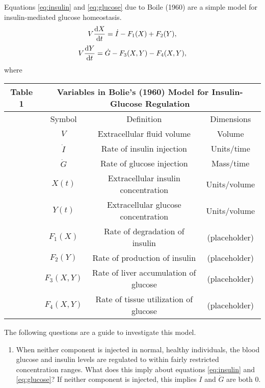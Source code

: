 \begin{homeworkProblem}
Equations \eqref{eq:insulin} and \eqref{eq:glucose} due to Boile (1960) are a
simple model for insulin-mediated glucose homeostasis.
\begin{equation}
    V \deriv[t]{X} = \dot{I} - F_1(X) + F_2(Y), \label{eq:insulin}
\end{equation}
\begin{equation}
    V \deriv[t]{Y} = \dot{G} - F_3(X, Y) - F_4(X, Y), \label{eq:glucose}
\end{equation}
where
\begin{table}[h!]
\centering
\begin{tabular}{c c|c|c}
\textbf{Table 1} &
\multicolumn{3}{|c|}{Variables in Bolie's (1960) Model for Insulin-Glucose Regulation }\\
\hline
& Symbol & Definition & Dimensions \\
\hline
& $V$ & Extracellular fluid volume & Volume \\
& $\dot{I}$ & Rate of insulin injection & Units/time \\
& $\dot{G}$ & Rate of glucose injection & Mass/time \\
& $X(t)$ & Extracellular insulin concentration & Units/volume \\
& $Y(t)$ & Extracellular glucose concentration & Units/volume \\
& $F_1(X)$ & Rate of degradation of insulin & (placeholder) \\
& $F_2(Y)$ & Rate of production of insulin & (placeholder) \\
& $F_3(X, Y)$ & Rate of liver accumulation of glucose & (placeholder) \\
& $F_4(X, Y)$ & Rate of tissue utilization of glucose & (placeholder) \\
\hline
\end{tabular}
\end{table}
The following questions are a guide to investigate this model.
\begin{enumerate}
\item When neither component is injected in normal, healthy individuals, the
blood glucose and insulin levels are regulated to within fairly restricted
concentration ranges. What does this imply about equations \eqref{eq:insulin}
and \eqref{eq:glucose}?
If neither component is injected, this implies $\dot{I}$ and $\dot{G}$ are both 0.

\end{enumerate}
\end{homeworkProblem}